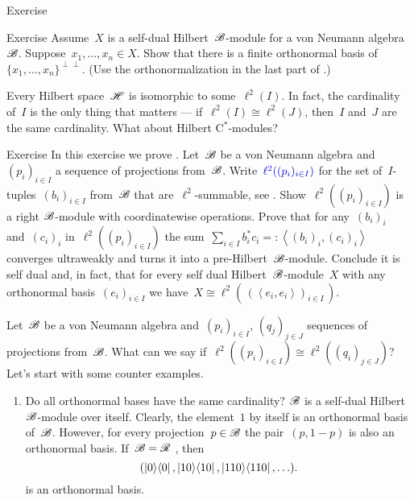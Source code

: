 \documentclass[b]{subfiles}
\begin{document}
\begin{parsec}
\begin{point}{Exercise}
\end{point}
\begin{point}{Exercise}%
Assume~$X$ is a self-dual Hilbert~$\mathscr{B}$-module for a von Neumann
    algebra~$\mathscr{B}$.
Suppose~$x_1, \ldots, x_n \in X$.
Show that there is a finite orthonormal basis
    of~$\{x_1, \ldots, x_n\}^{\perp\perp}$.
(Use the orthonormalization in the last part of .)
\end{point}
\end{parsec}


\begin{parsec}%
\begin{point}%
Every Hilbert space~$\mathscr{H}$ is isomorphic to some~$\ell^2(I)$.
In fact, the cardinality of~$I$ is the only thing that matters
    --- if~$\ell^2(I) \cong \ell^2(J)$, then~$I$ and~$J$
    are the same cardinality.
What about Hilbert C$^*$-modules?
\end{point}
\begin{point}[hilbmod-el2]{Exercise}%
In this exercise we prove \cite[Thm.~3.12]{paschke}.
Let~$\mathscr{B}$ be a von Neumann algebra
    and~$(p_i)_{i \in I}$
    a sequence of projections from~$\mathscr{B}$.
Write~$\Define{\ell^2((p_i)_{i \in I})}$
    for the set of~$I$-tuples~$(b_i)_{i \in I}$
        from~$\mathscr{B}$
        that are~$\ell^2$-summable, see .
Show~$\ell^2((p_i)_{i \in I})$
    is a right $\mathscr{B}$-module
    with coordinatewise operations.
Prove that for any~$(b_i)_i$ and~$(c_i)_i$
    in~$\ell^2((p_i)_{i \in I})$
    the sum~$\sum_{i \in I} b_i^* c_i =: \left<(b_i)_i, (c_i)_i\right>$
    converges ultraweakly
    and turns it into a pre-Hilbert~$\mathscr{B}$-module.
Conclude it is self dual
and, in fact, that for every self dual Hilbert~$\mathscr{B}$-module~$X$
    with any orthonormal basis~$(e_i)_{i \in I}$
    we have~$X \cong \ell^2(\,(\left<e_i,e_i\right>)_{i \in I}\,)$.
\end{point}

\begin{point}%
    Let~$\mathscr{B}$ be a von Neumann algebra
        and~$(p_i)_{i \in I}$, $(q_j)_{j \in J}$
        sequences of projections from~$\mathscr{B}$.
    What can we say if~$\ell^2((p_i)_{i \in I}) 
            \cong \ell^2((q_i)_{j \in J})$?
    Let's start with some counter examples.
\begin{enumerate}
\item
Do all orthonormal bases have the same cardinality?
$\mathscr{B}$ is a self-dual Hilbert~$\mathscr{B}$-module over itself.
Clearly, the element~$1$ by itself is an orthonormal basis of~$\mathscr{B}$.
However, for every projection~$p \in \mathscr{B}$
    the pair~$(p,1-p)$ is also an orthonormal basis.
If~$\mathscr{B} = \mathscr{R}$ ,
then~
\begin{equation*}
(\left|0\right>\!\left<0\right|, \left|10\right>\!\left<10\right|, \left|110\right>\!\left<110\right|, \ldots ).
\end{equation*}
is an orthonormal basis.


\end{enumerate}
\end{point}
\end{parsec}
\end{document}
